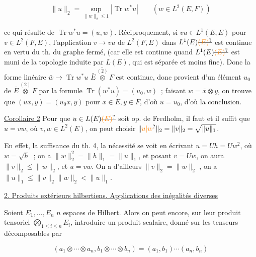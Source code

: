 \[
\|u\|_2=\sup_{\|w\|_2\leq1}|\operatorname{Tr}w^*u|\qquad(w\in L^2(E,F))
\]

ce qui résulte  de $\operatorname{Tr}w^*u=(u,w)$. Réciproquement,
si $vu\in L^1(E,E)$ pour  $v\in L^2(F,E)$,
l'application $v\to vu$ de $L^2(F,E)$ dans $L^1(E)\deleted{\unsure{(E)}}$
est continue en vertu du th. du graphe fermé,
(car elle est continue quand $L^1(E)\deleted{\unsure{(E)}}$ est muni de
la topologie induite par $L(E)$, qui est séparée et moins fine).
Donc la forme linéaire $\bar w\to\operatorname{Tr}w^*u$   $\overline{\bar E\overset{(2)}{\otimes}F}$ est
continue, donc provient d'un élément $u_0$ de $\bar E\overset{(2)}{\otimes}F$
par la formule  $\operatorname{Tr}(w^*u)=(u_0,w)$ \,; faisant
$w=\bar x\otimes y$, on trouve que $(ux,y)=(u_0x,y)$ pour
 $x\in E,y\in F$, d'où $u=u_0$, d'où la conclusion.


\uline{Corollaire 2} Pour que $u\in L(E)\deleted{\unsure{(E)}}$ soit op. de Fredholm,
il faut et il suffit que $u=vw$, où $v,w\in L^2(E)$, on
peut choisir $\|\unsure{u|w}\|_2=\|v\|_2=\sqrt{\|u\|_1}$.

En effet, la suffisance   du th. 4, la
nécessité se voit en écrivant $u=Uh=Uw^2$, où
$w=\sqrt h$ \,; on a  $\|w\|_2^2=\|h\|_1=\|u\|_1$,
et posant $v=Uw$, on aura $\|v\|_2\leq\|w\|_2$, et
 $u=vw$. On a d'ailleurs $\|v\|_2=\|w\|_2$ , 
on a $\|u\|_1\leq\|v\|_2\|w\|_2<\|u\|_1$.

\uline{2. Produits extérieurs hilbertiens. Applications  des inégalités diverses}

Soient $E_1,\ldots,E_n$ $n$ espaces de Hilbert. Alors on peut
encore, sur leur produit tensoriel $\bigotimes_{1\leq i\leq n}E_i$, introduire
un produit scalaire, donné sur les tenseurs décomposables
par

\[
(a_1\otimes\cdots\otimes a_n,b_1\otimes\cdots\otimes b_n)=(a_1,b_1)\cdots(a_n,b_n) \tag*{(1)}
\]

